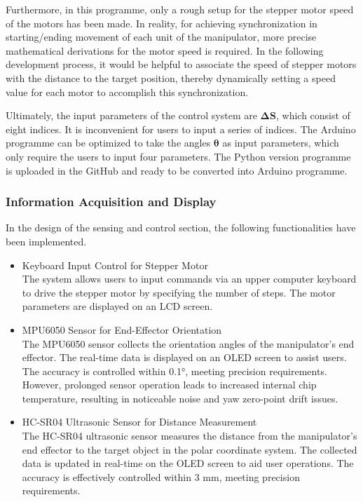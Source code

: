 Furthermore, in this programme, only a rough setup for the stepper motor speed of the motors has been made. In reality, for 
achieving synchronization in starting/ending movement of each unit of the manipulator, more precise mathematical 
derivations for the motor speed is required. In the following development process, it would be helpful to 
associate the speed of stepper motors with the distance to the target position, thereby dynamically setting a 
speed value for each motor to accomplish this synchronization.

Ultimately, the input parameters of the control system are $\boldsymbol{\Delta S}$, which consist of eight indices. 
It is inconvenient for users to input a series of indices. The Arduino programme can be optimized to take the 
angles $\boldsymbol{\theta}$ as input parameters, which only require the users to input four parameters. The Python 
version programme is uploaded in the GitHub and ready to be converted into Arduino programme.
\subsubsection{Information Acquisition and Display}
In the design of the sensing and control section, the following functionalities have been implemented. 
\begin{itemize}
    \item Keyboard Input Control for Stepper Motor \\
    The system allows users to input commands via an upper computer keyboard to drive the stepper motor by specifying 
    the number of steps. The motor parameters are displayed on an LCD screen.
    \item MPU6050 Sensor for End-Effector Orientation \\
    The MPU6050 sensor collects the orientation angles of the manipulator’s end effector. The real-time data is displayed 
    on an OLED screen to assist users. The accuracy is controlled within 0.1°, meeting precision requirements. However, 
    prolonged sensor operation leads to increased internal chip temperature, resulting in noticeable noise and yaw zero-point 
    drift issues.
    \item HC-SR04 Ultrasonic Sensor for Distance Measurement \\
    The HC-SR04 ultrasonic sensor measures the distance from the manipulator’s end effector to the target object in 
    the polar coordinate system. The collected data is updated in real-time on the OLED screen to aid user operations. 
    The accuracy is effectively controlled within 3 mm, meeting precision requirements.
\end{itemize}

